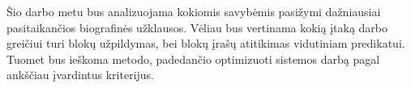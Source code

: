 Šio darbo metu bus analizuojama kokiomis savybėmis pasižymi dažniausiai pasitaikančios biografinės užklausos.
Vėliau bus vertinama kokią įtaką darbo greičiui turi blokų užpildymas, bei blokų įrašų atitikimas vidutiniam predikatui.
Tuomet bus ieškoma metodo, padedančio optimizuoti sistemos darbą pagal ankščiau įvardintus kriterijus.



